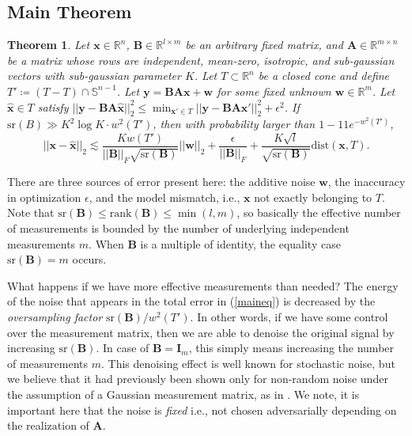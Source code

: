 \documentclass{article}
\def \xhat {\mathbf{\hat{x}}}
\newtheorem{theorem}{Theorem}[section]
\begin{document}
\subsection{Main Theorem} \label{mainthm}
\begin{theorem} \label{main}
Let $\mathbf{x} \in \mathbb{R}^n$, $\mathbf{B} \in \mathbb{R}^{l \times m}$ be an arbitrary fixed matrix, and $\mathbf{A} \in \mathbb{R}^{m \times n}$ be a matrix whose rows are independent, mean-zero, isotropic, and sub-gaussian vectors with sub-gaussian parameter $K$. Let $T \subset \mathbb{R}^n$ be a closed cone and define $T' \coloneqq (T-T)\cap \mathbb{S}^{n-1}$. Let $\mathbf{y} = \mathbf{B}\mathbf{A}\mathbf{x}+\mathbf{w}$ for some fixed unknown $\mathbf{w} \in \mathbb{R}^m$. Let $\xhat \in T$ satisfy $||\mathbf{y} - \mathbf{B}\mathbf{A} \xhat||_2^2 \leq \min_{\mathbf{x}' \in T} ||\mathbf{y} - \mathbf{B}\mathbf{A}\mathbf{x}'||_2^2 + \epsilon^2$. If $\mathrm{sr}(B) \gg K^2 \log K \cdot w^2(T')$, then with probability larger than $1-11e^{-w^2(T')}$,
\begin{equation} \label{maineq}
    ||\mathbf{x} - \xhat||_2 \lesssim \frac{Kw(T')}{||\mathbf{B}||_F \sqrt{\mathrm{sr}(\mathbf{B})}} ||\mathbf{w}||_2 + \frac{\epsilon}{||\mathbf{B}||_F} + \frac{K\sqrt{l}}{\sqrt{\mathrm{sr}(\mathbf{B})}} \mathrm{dist}(\mathbf{x}, T).
\end{equation}
\end{theorem}

\par
There are three sources of error present here: the additive noise $\mathbf{w}$, the inaccuracy in optimization $\epsilon$, and the model mismatch, i.e., $\mathbf{x}$ not exactly belonging to $T$. Note that ${\mathrm{sr}(\mathbf{B}) \leq \mathrm{rank}(\mathbf{B}) \leq \min(l,m)}$, so basically the effective number of measurements is bounded by the number of underlying independent measurements $m$. When $\mathbf{B}$ is a multiple of identity, the equality case $\mathrm{sr}(\mathbf{B}) = m$ occurs.

\par
What happens if we have more effective measurements than needed? The energy of the noise that appears in the total error in (\ref{maineq}) is decreased by the \textit{oversampling factor} ${\mathrm{sr}(\mathbf{B})}/w^2(T')$. In other words, if we have some control over the measurement matrix, then we are able to denoise the original signal by increasing $\mathrm{sr}(\mathbf{B})$. In case of $\mathbf{B} = \mathbf{I}_m$, this simply means increasing the number of measurements $m$. This denoising effect is well known for stochastic noise, but we believe that it had previously been shown only for non-random noise under the assumption of a Gaussian measurement matrix, as in \cite{thrampoulidis2014simple}.  We note, it is important here that the noise is \textit{fixed} i.e., not chosen adversarially depending on the realization of $\mathbf{A}$.
\end{document}
